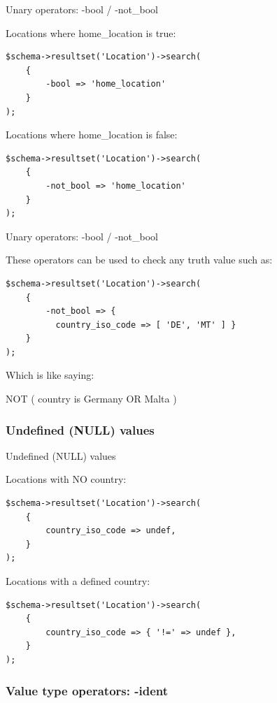 \begin{frame}[fragile]{Unary operators: -bool / -not\_bool}

Locations where home\_location is true:

\begin{lstlisting}
$schema->resultset('Location')->search(
    {
        -bool => 'home_location'
    }
);
\end{lstlisting}

Locations where home\_location is false:

\begin{lstlisting}
$schema->resultset('Location')->search(
    {
        -not_bool => 'home_location'
    }
);
\end{lstlisting}
\end{frame}

\begin{frame}[fragile]{Unary operators: -bool / -not\_bool}

These operators can be used to check any truth value such as:

\begin{lstlisting}
$schema->resultset('Location')->search(
    {
        -not_bool => { 
          country_iso_code => [ 'DE', 'MT' ] }
    }
);
\end{lstlisting}

Which is like saying:

NOT ( country is Germany OR Malta )
\end{frame}

\subsubsection{Undefined (NULL) values}
\begin{frame}[fragile]{Undefined (NULL) values}

Locations with NO country:

\begin{lstlisting}
$schema->resultset('Location')->search(
    {
        country_iso_code => undef,
    }
);
\end{lstlisting}

Locations with a defined country:

\begin{lstlisting}
$schema->resultset('Location')->search(
    {
        country_iso_code => { '!=' => undef },
    }
);
\end{lstlisting}
\end{frame}

\subsubsection{Value type operators: -ident}

